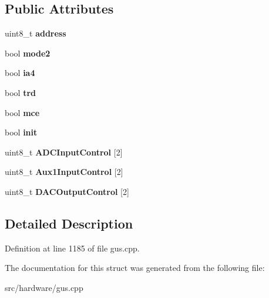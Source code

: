 \subsection*{Public Attributes}
\begin{DoxyCompactItemize}
\item 
\hypertarget{structgus__cs4231_a854196e166728ab338bd4dc1825e5376}{uint8\-\_\-t {\bfseries address}}\label{structgus__cs4231_a854196e166728ab338bd4dc1825e5376}

\item 
\hypertarget{structgus__cs4231_a1a0f1c8241e22df8912de936d6dd36a2}{bool {\bfseries mode2}}\label{structgus__cs4231_a1a0f1c8241e22df8912de936d6dd36a2}

\item 
\hypertarget{structgus__cs4231_ac856e0ff138f97283412af3a660ae48f}{bool {\bfseries ia4}}\label{structgus__cs4231_ac856e0ff138f97283412af3a660ae48f}

\item 
\hypertarget{structgus__cs4231_a98abeed198155481a7acbf4816affc16}{bool {\bfseries trd}}\label{structgus__cs4231_a98abeed198155481a7acbf4816affc16}

\item 
\hypertarget{structgus__cs4231_a6fc11df0fe6de72eaac011a4eaeb506e}{bool {\bfseries mce}}\label{structgus__cs4231_a6fc11df0fe6de72eaac011a4eaeb506e}

\item 
\hypertarget{structgus__cs4231_a1e1427d7fdd2d24972074cd552ea1e1f}{bool {\bfseries init}}\label{structgus__cs4231_a1e1427d7fdd2d24972074cd552ea1e1f}

\item 
\hypertarget{structgus__cs4231_a555b8f8e51d7a01912a32d399e50e264}{uint8\-\_\-t {\bfseries A\-D\-C\-Input\-Control} \mbox{[}2\mbox{]}}\label{structgus__cs4231_a555b8f8e51d7a01912a32d399e50e264}

\item 
\hypertarget{structgus__cs4231_ac5339efcc287958ad556d9fc7a590876}{uint8\-\_\-t {\bfseries Aux1\-Input\-Control} \mbox{[}2\mbox{]}}\label{structgus__cs4231_ac5339efcc287958ad556d9fc7a590876}

\item 
\hypertarget{structgus__cs4231_aecf705a077583ef50851864d5dd7ef53}{uint8\-\_\-t {\bfseries D\-A\-C\-Output\-Control} \mbox{[}2\mbox{]}}\label{structgus__cs4231_aecf705a077583ef50851864d5dd7ef53}

\end{DoxyCompactItemize}


\subsection{Detailed Description}


Definition at line 1185 of file gus.\-cpp.



The documentation for this struct was generated from the following file\-:\begin{DoxyCompactItemize}
\item 
src/hardware/gus.\-cpp\end{DoxyCompactItemize}
